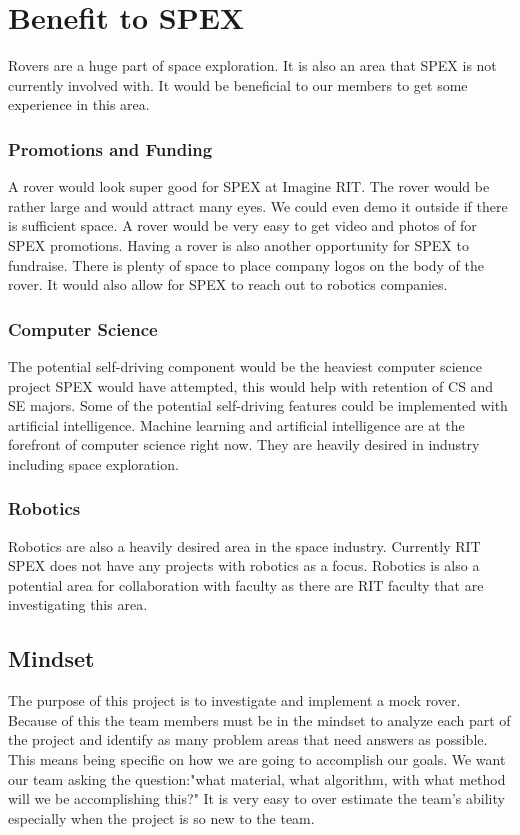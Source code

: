 \documentclass[conference]{IEEEtran} %
\begin{document}
\section{Benefit to SPEX}
\label{sec:benefit}

Rovers are a huge part of space exploration. 
It is also an area that SPEX is not currently involved with. 
It would be beneficial to our members to get some experience in this area.
\subsubsection{Promotions and Funding}
\label{promos}
A rover would look super good for SPEX at Imagine RIT. 
The rover would be rather large and would attract many eyes. We could even demo it outside if there is sufficient space. 
A rover would be very easy to get video and photos of for SPEX promotions. 
Having a rover is also another opportunity for SPEX to fundraise. 
There is plenty of space to place company logos on the body of the rover. 
It would also allow for SPEX to reach out to robotics companies.
\subsubsection{Computer Science}
\label{cs}
The potential self-driving component would be the heaviest computer science project SPEX would have attempted, this would help with retention of CS and SE majors. 
Some of the potential self-driving features could be implemented with artificial intelligence.
Machine learning and artificial intelligence are at the forefront of computer science right now. 
They are heavily desired in industry including space exploration.
\subsubsection{Robotics}
\label{robotics}
Robotics are also a heavily desired area in the space industry. Currently RIT SPEX does not have any projects with robotics as a focus. Robotics is also a potential area for collaboration with faculty as there are RIT faculty that are investigating this area. 


\subsection{Mindset}
\label{subsec:mindset}
The purpose of this project is to investigate and implement a mock rover.
Because of this the team members must be in the mindset to analyze each part of the project and identify as many problem areas that need answers as possible. 
This means being specific on how we are going to accomplish our goals.
We want our team asking the question:"what material, what algorithm, with what method will we be accomplishing this?"
It is very easy to over estimate the team's ability especially when the project is so new to the team.
\end{document}
